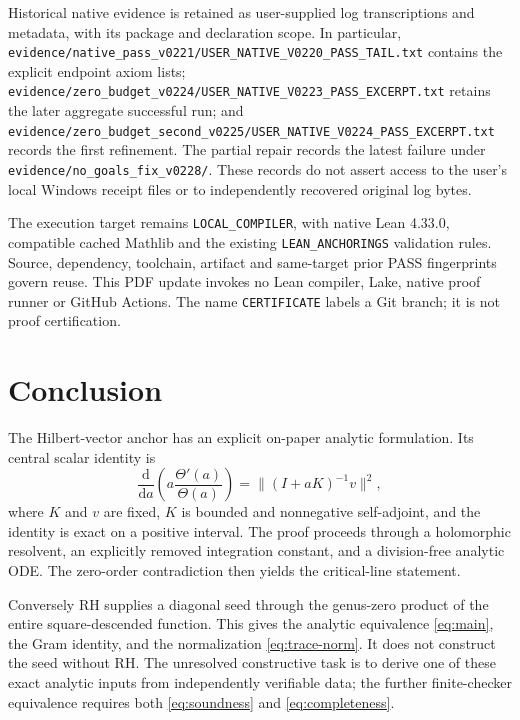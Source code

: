 \documentclass[11pt,a4paper]{article}
\numberwithin{equation}{section}
\theoremstyle{definition}
\theoremstyle{remark}
\newcommand{\norm}[1]{\lVert #1\rVert}
\begin{document}
Historical native evidence is retained as user-supplied log transcriptions
and metadata, with its package and declaration scope. In particular,
\nolinkurl{evidence/native_pass_v0221/USER_NATIVE_V0220_PASS_TAIL.txt}
contains the explicit endpoint axiom lists;
\nolinkurl{evidence/zero_budget_v0224/USER_NATIVE_V0223_PASS_EXCERPT.txt}
retains the later aggregate successful run; and
\nolinkurl{evidence/zero_budget_second_v0225/USER_NATIVE_V0224_PASS_EXCERPT.txt}
records the first refinement. The partial repair records the latest failure
under \nolinkurl{evidence/no_goals_fix_v0228/}.
These records do not assert access to the user's local Windows receipt
files or to independently recovered original log bytes.

The execution target remains \texttt{LOCAL\_COMPILER}, with native Lean
4.33.0, compatible cached Mathlib and the existing
\texttt{LEAN\_ANCHORINGS} validation rules. Source, dependency, toolchain,
artifact and same-target prior PASS fingerprints govern reuse. This PDF
update invokes no Lean compiler, Lake, native proof runner or GitHub Actions.
The name \texttt{CERTIFICATE} labels a Git branch; it is not proof certification.

\section{Conclusion}\label{sec:conclusion}

The Hilbert-vector anchor has an explicit on-paper analytic formulation. Its central scalar identity is
\[
\frac{\mathrm d}{\mathrm da}\left(a\frac{\Theta'(a)}{\Theta(a)}\right)
=\norm{(I+aK)^{-1}v}^2,
\]
where $K$ and $v$ are fixed, $K$ is bounded and nonnegative
self-adjoint, and the identity is exact on a positive interval.
The proof proceeds through a holomorphic resolvent, an explicitly
removed integration constant, and a division-free analytic ODE.
The zero-order contradiction then yields the critical-line statement.

Conversely RH supplies a diagonal seed through the genus-zero
product of the entire square-descended function. This gives the
analytic equivalence \eqref{eq:main}, the Gram identity, and the
normalization \eqref{eq:trace-norm}. It does not construct the seed
without RH. The unresolved constructive task is to derive one of
these exact analytic inputs from independently verifiable data;
the further finite-checker equivalence requires both
\eqref{eq:soundness} and \eqref{eq:completeness}.
\end{document}
